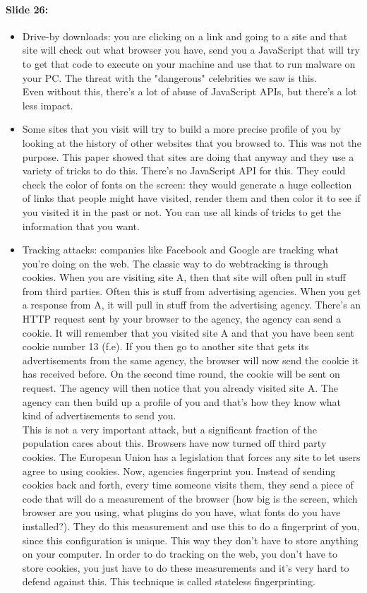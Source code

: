 \documentclass[10pt,a4paper]{report}
\begin{document}
\paragraph{Slide 26:}
\begin{itemize}
\item Drive-by downloads: you are clicking on a link and going to a site and that site will check out what browser you have, send you a JavaScript that will try to get that code to execute on your machine and use that to run malware on your PC. The threat with the "dangerous" celebrities we saw is this.\\
Even without this, there's a lot of abuse of JavaScript APIs, but there's a lot less impact.
\item Some sites that you visit will try to build a more precise profile of you by looking at the history of other websites that you browsed to. This was not the purpose. This paper showed that sites are doing that anyway and they use a variety of tricks to do this. There's no JavaScript API for this. They could check the color of fonts on the screen: they would generate a huge collection of links that people might have visited, render them and then color it to see if you visited it in the past or not. You can use all kinds of tricks to get the information that you want.
\item Tracking attacks: companies like Facebook and Google are tracking what you're doing on the web. The classic way to do webtracking is through cookies. When you are visiting site A, then that site will often pull in stuff from third parties. Often this is stuff from advertising agencies. When you get a response from A, it will pull in stuff from the advertising agency. There's an HTTP request sent by your browser to the agency, the agency can send a cookie. It will remember that you visited site A and that you have been sent cookie number 13 (f.e). If you then go to another site that gets its advertisements from the same agency, the browser will now send the cookie it has received before. On the second time round, the cookie will be sent on request. The agency will then notice that you already visited site A. The agency can then build up a profile of you and that's how they know what kind of advertisements to send you. \\
This is not a very important attack, but a significant fraction of the population cares about this. Browsers have now turned off third party cookies. The European Union has a legislation that forces any site to let users agree to using cookies. Now, agencies fingerprint you. Instead of sending cookies back and forth, every time someone visits them, they send a piece of code that will do a measurement of the browser (how big is the screen, which browser are you using, what plugins do you have, what fonts do you have installed?). They do this measurement and use this to do a fingerprint of you, since this configuration is unique. This way they don't have to store anything on your computer. In order to do tracking on the web, you don't have to store cookies, you just have to do these measurements and it's very hard to defend against this. This technique is called stateless fingerprinting.
\end{itemize}
\end{document}
